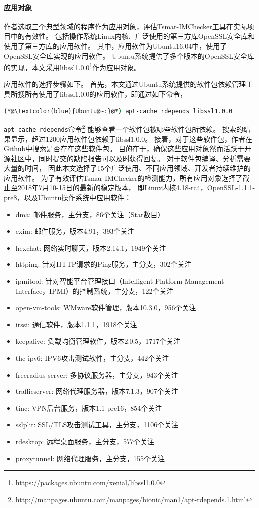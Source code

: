 \paragraph{应用对象}
作者选取三个典型领域的程序作为应用对象，评估Tsmar-IMChecker工具在实际项目中的有效性。
包括操作系统Linux内核、广泛使用的第三方库OpenSSL安全库和
使用了第三方库的应用软件。
其中，应用软件为Ubuntu16.04中，使用了OpenSSL安全库实现的应用软件。
Ubuntu系统提供了多个版本的OpenSSL安全库的实现，本文采用libssl1.0.0\footnote{https://packages.ubuntu.com/xenial/libssl1.0.0}作为应用对象。

应用软件的选择步骤如下。
首先，本文通过Ubuntu系统提供的软件包依赖管理工具所搜所有使用了libssl1.0.0的应用软件，即通过如下命令，
\begin{lstlisting}[language={bash},
basicstyle=\linespread{0.8}\listingsfont,
numbers=none,
xleftmargin=.25\textwidth]
(*@\textcolor{blue}{Ubuntu@~:}@*) apt-cache rdepends libssl1.0.0
\end{lstlisting}
\texttt{apt-cache rdepends}命令\footnote{http://manpages.ubuntu.com/manpages/bionic/man1/apt-rdepends.1.html}
能够查看一个软件包被哪些软件包所依赖。
搜索的结果显示，超过1200应用软件包依赖于libssl1.0.0。
接着，对于这些软件包，作者在Github中搜索是否存在这些软件包。
目的在于，确保这些应用对象然而活跃于开源社区中，同时提交的缺陷报告可以及时获得回复。
对于软件包编译、分析需要大量的时间，
因此本文选择了15个广泛使用、不同应用领域、开发者持续维护的应用软件。
为了有效评估Tsmar-IMChecker的检测能力，所有应用对象选择了截止至2018年7月10-15日的最新的稳定版本，
即Linux内核4.18-rc4，OpenSSL-1.1.1-pre8，以及Ubuntu操作系统中应用软件：
\begin{itemize}
	\item dma: 邮件服务，主分支，86个关注（Star数目）
	\item exim: 邮件服务，版本4.91，393个关注
	\item hexchat: 网络实时聊天，版本2.14.1，1949个关注
	\item httping: 针对HTTP请求的Ping服务，主分支，302个关注
	\item ipmitool: 针对智能平台管理接口（Intelligent Platform Management Interface，IPMI）的控制系统，主分支，122个关注
	\item open-vm-tools: WMware软件管理，版本10.3.0，956个关注
	\item irssi: 通信软件，版本1.1.1，1918个关注
	\item keepalive: 负载均衡管理软件，版本2.0.5，1717个关注
	\item thc-ipv6: IPV6攻击测试软件，主分支，442个关注
	\item freeradius-server: 多协议服务器，主分支，943个关注
	\item trafficserver: 网络代理服务器，版本7.1.3，907个关注
	\item tinc: VPN后台服务，版本1.1-pre16，854个关注
	\item sslplit: SSL/TLS攻击测试工具，主分支，1106个关注
	\item rdesktop: 远程桌面服务，主分支，577个关注
	\item proxytunnel: 网络代理服务，主分支，155个关注
\end{itemize}

